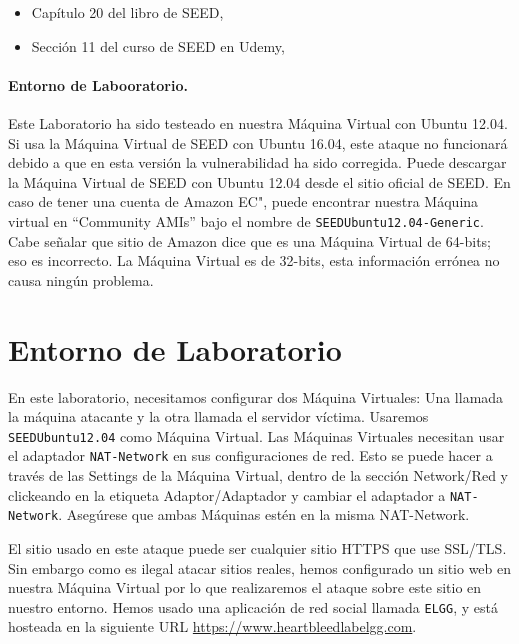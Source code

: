 \begin{itemize}
\item Capítulo 20 del libro de SEED, \seedbook
\item Sección 11 del curso de SEED en Udemy, \seedisvideo
\end{itemize}



\paragraph{Entorno de Labooratorio.} Este Laboratorio ha sido testeado en nuestra Máquina Virtual con Ubuntu 12.04. Si usa la Máquina Virtual de SEED con Ubuntu 16.04, este ataque no funcionará debido a que en esta versión la vulnerabilidad ha sido corregida.
Puede descargar la Máquina Virtual de SEED con Ubuntu 12.04 desde el sitio oficial de SEED. En caso de tener una cuenta de Amazon EC", puede encontrar nuestra Máquina virtual en ``Community AMIs'' bajo el nombre de \texttt{SEEDUbuntu12.04-Generic}. Cabe señalar que sitio de Amazon dice que es una Máquina Virtual de 64-bits; eso es incorrecto. La Máquina Virtual es de 32-bits, esta información errónea no causa ningún problema.



\section{Entorno de Laboratorio}

En este laboratorio, necesitamos configurar dos Máquina Virtuales: Una llamada la máquina atacante y la otra llamada el servidor víctima.
Usaremos \texttt{SEEDUbuntu12.04} como Máquina Virtual. Las Máquinas Virtuales necesitan usar el adaptador \texttt{NAT-Network} en sus configuraciones de red. Esto se puede hacer a través de las Settings de la Máquina Virtual, dentro de la sección Network/Red y clickeando en la etiqueta Adaptor/Adaptador y cambiar el adaptador a \texttt{NAT-Network}. Asegúrese que ambas Máquinas estén en la misma NAT-Network.

El sitio usado en este ataque puede ser cualquier sitio HTTPS que use SSL/TLS.
Sin embargo como es ilegal atacar sitios reales, hemos configurado un sitio web en nuestra Máquina Virtual por lo que realizaremos el ataque sobre este sitio en nuestro entorno.
Hemos usado una aplicación de red social llamada \texttt{ELGG}, y está hosteada en la siguiente URL  \url{https://www.heartbleedlabelgg.com}.

